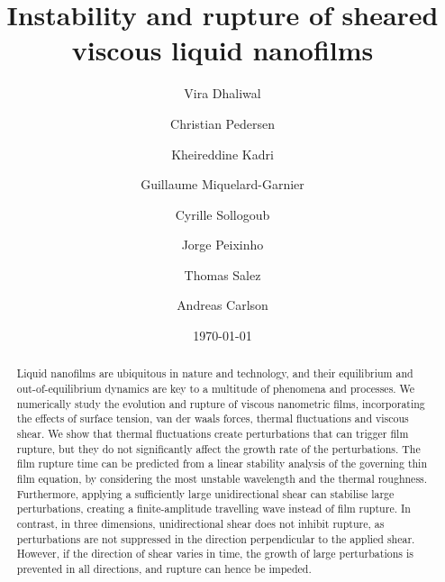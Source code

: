 \documentclass[
 onecolumn,
 amsmath,amssymb,
floatfix,superscriptaddress
]{revtex4-2}
\begin{document}
\title{Instability and rupture of sheared viscous liquid nanofilms}
\author{Vira Dhaliwal}
\author{Christian Pedersen}
\author{Kheireddine Kadri}
\author{Guillaume Miquelard-Garnier}
\author{Cyrille Sollogoub}
\author{Jorge Peixinho}
\author{Thomas Salez}
\author{Andreas Carlson}
\date{\today}
\begin{abstract}
Liquid nanofilms are ubiquitous in nature and technology, and their equilibrium and out-of-equilibrium dynamics are key to a multitude of phenomena and processes. We numerically study the evolution and rupture of viscous nanometric films, incorporating the effects of surface tension, van der waals forces, thermal fluctuations and viscous shear. We show that thermal fluctuations create perturbations that can trigger film rupture, but they do not significantly affect the growth rate of the perturbations. The  film rupture time can be predicted from a linear stability analysis of the governing thin film equation, by considering the most unstable wavelength and the thermal roughness. Furthermore, applying a sufficiently large unidirectional shear can stabilise large perturbations, creating a finite-amplitude travelling wave instead of film rupture. In contrast, in three dimensions, unidirectional shear does not inhibit rupture, as perturbations are not suppressed in the direction perpendicular to the applied shear. However, if the direction of shear varies in time, the growth of large perturbations is prevented in all directions, and rupture can hence be impeded.
\end{abstract}
\maketitle
\end{document}
